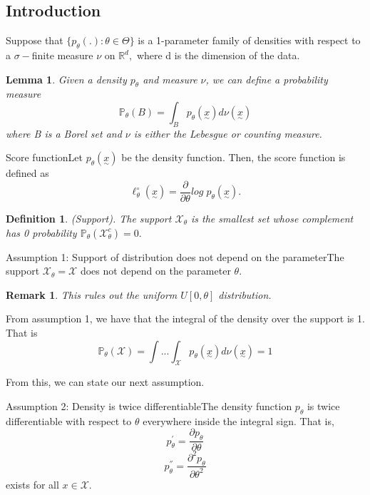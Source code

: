 \documentclass[twoside]{article}
\newtheorem{lemma}[theorem]{Lemma}
\newtheorem{definition}[theorem]{Definition}
\newtheorem{remark}[theorem]{Remark}
\newcommand{\prob}{\mathbb{P}}
\newcommand{\utilde}{\underset{\sim}}
\begin{document}
\subsection{Introduction}

Suppose that $\{p_{\theta}(.): \theta \in \Theta\}$ is a 1-parameter family of densities with respect to a $\sigma-$finite measure $\nu$ on $\mathbb{R}^d,$ where d is the dimension of the data.

\begin{lemma}Given a density $p_{\theta}$ and measure $\nu$, we can define a probability measure 
$$
\prob_{\theta}(B) = \int_{B}p_{\theta}(\utilde{x})d\nu(\utilde{x})
$$
where B is a Borel set and $\nu$ is either the Lebesgue or counting measure.
\end{lemma}

\begin{definition_exam}{Score function}{}Let $p_{\theta}(\utilde{x})$ be the density function. Then, the score function is defined as $$\ell_{\theta}^{\circ}(\utilde{x}) = \frac{\partial}{\partial \theta}log\; p_{\theta}(\utilde{x}).$$
\end{definition_exam}

\begin{definition}(Support). The support $\mathcal{X}_{\theta}$ is the smallest set whose complement has 0 probability $\prob_{\theta}(\mathcal{X}_{\theta}^c) = 0.$
\end{definition}

\begin{definition_exam}{Assumption 1: Support of distribution does not depend on the parameter}{}The support $\mathcal{X}_{\theta} = \mathcal{X}$ does not depend on the parameter $\theta$.
\end{definition_exam}

\begin{remark}This rules out the uniform $U[0,\theta]$ distribution.
\end{remark}

From assumption 1, we have that the integral of the density over the support is 1. That is 
\begin{equation}
\prob_{\theta}(\mathcal{X}) = \int...\int_{\mathcal{X}}p_{\theta}(\utilde{x})d\nu(\utilde{x}) = 1 \tag{13.1}
\end{equation}

From this, we can state our next assumption.

\begin{definition_exam}{Assumption 2: Density is twice differentiable}{}The density function $p_{\theta}$ is twice differentiable with respect to $\theta$ everywhere inside the integral sign. That is, 
$$
p_{\theta}^{'} = \frac{\partial p_{\theta}}{\partial \theta}
$$
$$
p_{\theta}^{''} = \frac{\partial^2 p_{\theta}}{\partial \theta^2}
$$
exists for all $x \in \mathcal{X}.$
\end{definition_exam}
\end{document}
